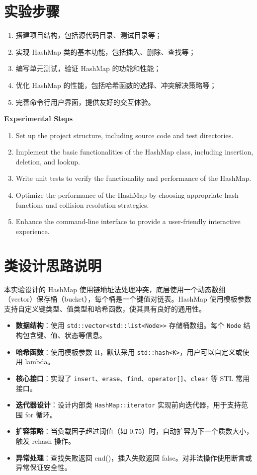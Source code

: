 \documentclass{article}
\begin{document}
    \section{实验步骤}
    \begin{enumerate}
        \item 搭建项目结构，包括源代码目录、测试目录等；
        \item 实现 HashMap 类的基本功能，包括插入、删除、查找等；
        \item 编写单元测试，验证 HashMap 的功能和性能；
        \item 优化 HashMap 的性能，包括哈希函数的选择、冲突解决策略等；
        \item 完善命令行用户界面，提供友好的交互体验。
    \end{enumerate}

    \bigskip
    \textbf{Experimental Steps}\\
    \begin{enumerate}
        \item Set up the project structure, including source code and test directories.
        \item Implement the basic functionalities of the HashMap class, including insertion, deletion, and lookup.
        \item Write unit tests to verify the functionality and performance of the HashMap.
        \item Optimize the performance of the HashMap by choosing appropriate hash functions and collision resolution strategies.
        \item Enhance the command-line interface to provide a user-friendly interactive experience.
    \end{enumerate}

\section{类设计思路说明}

本实验设计的 HashMap 使用链地址法处理冲突，底层使用一个动态数组（vector）保存桶（bucket），每个桶是一个键值对链表。HashMap 使用模板参数支持自定义键类型、值类型和哈希函数，使其具有良好的通用性。

\begin{itemize}
    \item \textbf{数据结构}：使用 \texttt{std::vector<std::list<Node>>} 存储桶数组。每个 \texttt{Node} 结构包含键、值、状态等信息。
    \item \textbf{哈希函数}：使用模板参数 H，默认采用 \texttt{std::hash<K>}，用户可以自定义或使用 lambda。
    \item \textbf{核心接口}：实现了 \texttt{insert}、\texttt{erase}、\texttt{find}、\texttt{operator[]}、\texttt{clear} 等 STL 常用接口。
    \item \textbf{迭代器设计}：设计内部类 \texttt{HashMap::iterator} 实现前向迭代器，用于支持范围 for 循环。
    \item \textbf{扩容策略}：当负载因子超过阈值（如 0.75）时，自动扩容为下一个质数大小，触发 rehash 操作。
    \item \textbf{异常处理}：查找失败返回 end()，插入失败返回 false。对非法操作使用断言或异常保证安全性。
\end{itemize}
\end{document}
